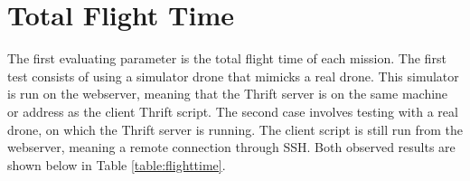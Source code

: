 
\section{Total Flight Time}
\label{sect:totaltime}
The first evaluating parameter is the total flight time of each mission. The first test consists of using a simulator drone that mimicks a real drone. This simulator is run on the webserver, meaning that the Thrift server is on the same machine or address as the client Thrift script. The second case involves testing with a real drone, on which the Thrift server is running. The client script is still run from the webserver, meaning a remote connection through SSH. Both observed results are shown below in Table \ref{table:flighttime}.


